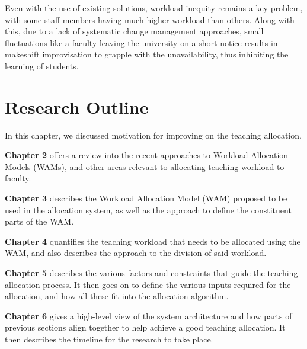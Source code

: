 Even with the use of existing solutions, workload inequity remains a key problem, with some staff members having much higher workload than others. Along with this, due to a lack of systematic change management approaches, small fluctuations like a faculty leaving the university on a short notice results in makeshift improvisation to grapple with the unavailability, thus inhibiting the learning of students.

\section{Research Outline}

In this chapter, we discussed motivation for improving on the teaching allocation.

\textbf{Chapter 2} offers a review into the recent approaches to Workload Allocation Models (WAMs), and other areas relevant to allocating teaching workload to faculty.

\textbf{Chapter 3} describes the Workload Allocation Model (WAM) proposed to be used in the allocation system, as well as the approach to define the constituent parts of the WAM.

\textbf{Chapter 4} quantifies the teaching workload that needs to be allocated using the WAM, and also describes the approach to the division of said workload.

\textbf{Chapter 5} describes the various factors and constraints that guide the teaching allocation process. It then goes on to define the various inputs required for the allocation, and how all these fit into the allocation algorithm.

\textbf{Chapter 6} gives a high-level view of the system architecture and how parts of previous sections align together to help achieve a good teaching allocation. It then describes the timeline for the research to take place.

